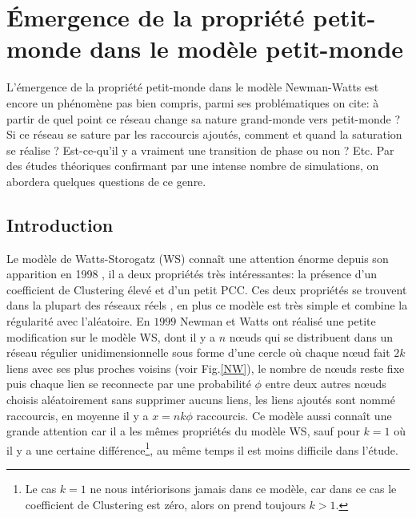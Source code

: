 \chapter{Émergence de la propriété petit-monde dans le modèle petit-monde}
L'émergence de la propriété petit-monde dans le modèle Newman-Watts est encore un phénomène pas bien compris, parmi ses problématiques on cite: à partir de quel point ce réseau change sa nature grand-monde vers petit-monde ? Si ce réseau se sature par les raccourcis ajoutés, comment et quand la saturation se réalise ? Est-ce-qu'il y a vraiment une transition de phase ou non ? Etc.
Par des études théoriques confirmant par une intense nombre de simulations, on abordera quelques questions de ce genre.
\section{Introduction}

Le modèle de Watts-Storogatz (WS) connaît une attention énorme depuis son apparition en 1998 \cite{Watss-Strogatz1998}, il a deux propriétés très intéressantes: la présence d'un coefficient de Clustering élevé et d'un petit PCC. Ces deux propriétés se trouvent dans la plupart des réseaux réels \cite{Cohen-Havlinl2010,Newman2010}, en plus ce modèle est très simple et combine la régularité avec l'aléatoire. En $1999$ Newman et Watts \cite{Newman-Watts1999} ont réalisé une petite modification sur le modèle WS, dont il y a $n$ nœuds qui se distribuent dans un réseau régulier unidimensionnelle sous forme d'une cercle où chaque nœud fait $2k$ liens avec ses plus proches voisins (voir Fig.\ref{NW}), le nombre de nœuds reste fixe puis chaque lien se reconnecte par une probabilité $\phi$ entre deux autres nœuds choisis aléatoirement sans supprimer aucuns liens, les liens ajoutés sont nommé raccourcis, en moyenne il y a $x=nk\phi$ raccourcis. Ce modèle aussi connaît une grande attention car il a les m\^{e}mes propriétés du modèle WS, sauf pour $k=1$ où il y a une certaine différence\footnote{Le cas $k=1$ ne nous intériorisons jamais dans ce modèle, car dans ce cas le coefficient de Clustering est zéro, alors on prend toujours $k>1$. }, au m\^{e}me temps il est moins difficile dans l'étude.

